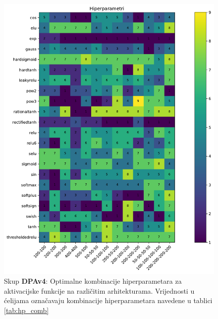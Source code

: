 \documentclass[times, utf8, numeric, diplomski]{fer}
\begin{document}
\begin{figure}[ht]
\includegraphics[width=\textwidth]{greedy_9_hp.pdf}
\centering
\caption{Skup \textbf{DPAv4}: Optimalne kombinacije hiperparametara za aktivacijske funkcije na različitim arhitekturama. Vrijednosti u ćelijama označavaju kombinacije hiperparametara navedene u tablici \ref{tab:hp_comb}}
\label{fig:greedy_9_hp}
\end{figure}
\end{document}
